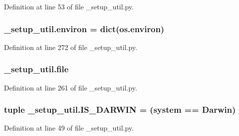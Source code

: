 Definition at line 53 of file \+\_\+setup\+\_\+util.\+py.

\subsubsection[{\texorpdfstring{environ}{environ}}]{\setlength{\rightskip}{0pt plus 5cm}\+\_\+setup\+\_\+util.\+environ = dict(os.\+environ)}\hypertarget{namespace__setup__util_a9a935bdd9ee1aa0327161025bb18c136}{}\label{namespace__setup__util_a9a935bdd9ee1aa0327161025bb18c136}


Definition at line 272 of file \+\_\+setup\+\_\+util.\+py.

\subsubsection[{\texorpdfstring{file}{file}}]{\setlength{\rightskip}{0pt plus 5cm}\+\_\+setup\+\_\+util.\+file}\hypertarget{namespace__setup__util_aea63a1b32cc79bc3d872ab7cb30dd07e}{}\label{namespace__setup__util_aea63a1b32cc79bc3d872ab7cb30dd07e}


Definition at line 261 of file \+\_\+setup\+\_\+util.\+py.

\subsubsection[{\texorpdfstring{I\+S\+\_\+\+D\+A\+R\+W\+IN}{IS_DARWIN}}]{\setlength{\rightskip}{0pt plus 5cm}tuple \+\_\+setup\+\_\+util.\+I\+S\+\_\+\+D\+A\+R\+W\+IN = ({\bf system} == \textquotesingle{}Darwin\textquotesingle{})}\hypertarget{namespace__setup__util_aecbb100ce6f94bb3c7e16d58fde05f96}{}\label{namespace__setup__util_aecbb100ce6f94bb3c7e16d58fde05f96}


Definition at line 49 of file \+\_\+setup\+\_\+util.\+py.

